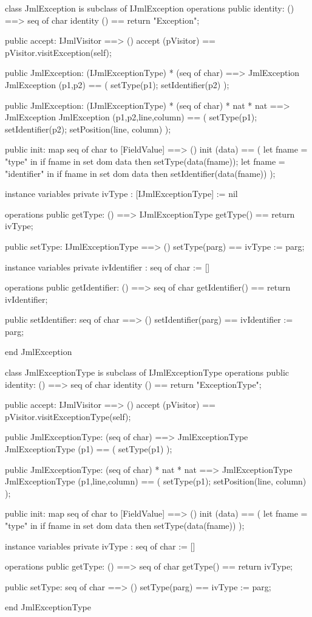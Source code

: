 \begin{vdm_al}
class JmlException is subclass of IJmlException
operations
  public identity: () ==> seq of char
  identity () == return "Exception";

  public accept: IJmlVisitor ==> ()
  accept (pVisitor) == pVisitor.visitException(self);

  public JmlException:
    (IJmlExceptionType) *
    (seq of char) ==> JmlException
  JmlException (p1,p2) == 
    ( setType(p1);
      setIdentifier(p2) );

  public JmlException:
    (IJmlExceptionType) *
    (seq of char) *
    nat *
    nat ==> JmlException
  JmlException (p1,p2,line,column) == 
    ( setType(p1);
      setIdentifier(p2);
      setPosition(line, column) );

  public init: map seq of char to [FieldValue] ==> ()
  init (data) ==
    ( let fname = "type" in
        if fname in set dom data
        then setType(data(fname));
      let fname = "identifier" in
        if fname in set dom data
        then setIdentifier(data(fname)) );

instance variables
  private ivType : [IJmlExceptionType] := nil

operations
  public getType: () ==> IJmlExceptionType
  getType() == return ivType;

  public setType: IJmlExceptionType ==> ()
  setType(parg) == ivType := parg;

instance variables
  private ivIdentifier : seq of char := []

operations
  public getIdentifier: () ==> seq of char
  getIdentifier() == return ivIdentifier;

  public setIdentifier: seq of char ==> ()
  setIdentifier(parg) == ivIdentifier := parg;

end JmlException
\end{vdm_al}

\begin{vdm_al}
class JmlExceptionType is subclass of IJmlExceptionType
operations
  public identity: () ==> seq of char
  identity () == return "ExceptionType";

  public accept: IJmlVisitor ==> ()
  accept (pVisitor) == pVisitor.visitExceptionType(self);

  public JmlExceptionType:
    (seq of char) ==> JmlExceptionType
  JmlExceptionType (p1) == 
    ( setType(p1) );

  public JmlExceptionType:
    (seq of char) *
    nat *
    nat ==> JmlExceptionType
  JmlExceptionType (p1,line,column) == 
    ( setType(p1);
      setPosition(line, column) );

  public init: map seq of char to [FieldValue] ==> ()
  init (data) ==
    ( let fname = "type" in
        if fname in set dom data
        then setType(data(fname)) );

instance variables
  private ivType : seq of char := []

operations
  public getType: () ==> seq of char
  getType() == return ivType;

  public setType: seq of char ==> ()
  setType(parg) == ivType := parg;

end JmlExceptionType
\end{vdm_al}


